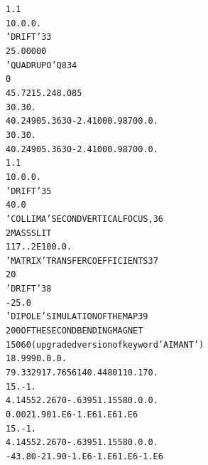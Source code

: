 \begin{tiny}
\begin{alltt}
    1.1                                                                         
    1  0. 0. 0.                                                                 
   'DRIFT'                                                                33
     25.00000                                                                   
   'QUADRUPO'                            Q8                               34
   0                                                        
    45.72  15.24  8.085                                                         
    30. 30.                                                                     
    4    0.2490   5.3630  -2.4100   0.9870   0.   0.                            
    30. 30.                                                                     
    4    0.2490   5.3630  -2.4100   0.9870   0.   0.                            
     1.1                                                                        
    1  0. 0. 0.                                                                 
   'DRIFT'                                                               35
     40.0                                                                       
   'COLLIMA'                             SECOND  VERTICAL  FOCUS,        36
    2                                    MASS  SLIT                             
   1  17.   .2E10   0. 0.                                                       
   'MATRIX'                              TRANSFER  COEFFICIENTS          37
   2 0                                                                          
   'DRIFT'                                                               38
   -25.0                                                                        
   'DIPOLE'                              SIMULATION  OF  THE  MAP        39
    2 0 0                                OF  THE  SECOND  BENDING  MAGNET       
    150  60               (upgraded version of keyword 'AIMANT')
     18.999   0. 0. 0.                                                          
     79.3329   17.7656  140.4480   110.  170.                                   
    15. -1.                                                                     
    4  .1455   2.2670  -.6395  1.1558  0. 0.  0.                                
    0.00    21.90  1.E6 -1.E6  1.E6  1.E6                                       
    15. -1.                                                                     
    4  .1455   2.2670  -.6395  1.1558  0. 0.  0.                                
   -43.80  -21.90 -1.E6 -1.E6  1.E6 -1.E6                                       

\end{alltt}
\end{tiny}
